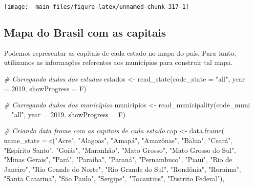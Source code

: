\documentclass[
  brazilian,
]{book}
\newenvironment{Shaded}{\begin{snugshade}}{\end{snugshade}}
\newcommand{\AttributeTok}[1]{\textcolor[rgb]{0.77,0.63,0.00}{#1}}
\newcommand{\CommentTok}[1]{\textcolor[rgb]{0.56,0.35,0.01}{\textit{#1}}}
\newcommand{\DecValTok}[1]{\textcolor[rgb]{0.00,0.00,0.81}{#1}}
\newcommand{\FunctionTok}[1]{\textcolor[rgb]{0.00,0.00,0.00}{#1}}
\newcommand{\NormalTok}[1]{#1}
\newcommand{\OtherTok}[1]{\textcolor[rgb]{0.56,0.35,0.01}{#1}}
\newcommand{\StringTok}[1]{\textcolor[rgb]{0.31,0.60,0.02}{#1}}
\begin{document}
\begin{center}\texttt{[image: \_main\_files/figure-latex/unnamed-chunk-317-1]} \end{center}

\hypertarget{mapa-do-brasil-com-as-capitais}{%
\subsection{Mapa do Brasil com as capitais}\label{mapa-do-brasil-com-as-capitais}}

Podemos representar as capitais de cada estado no mapa do país. Para tanto, utilizamos as informações referentes aos municípios para construir tal mapa.

\begin{Shaded}
\begin{Highlighting}[]
\CommentTok{\# Carregando dados dos estados}
\NormalTok{estados }\OtherTok{\textless{}{-}} \FunctionTok{read\_state}\NormalTok{(}\AttributeTok{code\_state =} \StringTok{"all"}\NormalTok{,}
                      \AttributeTok{year =} \DecValTok{2019}\NormalTok{,}
                      \AttributeTok{showProgress =}\NormalTok{ F)}

\CommentTok{\# Carregando dados dos municípios}
\NormalTok{municipios }\OtherTok{\textless{}{-}} \FunctionTok{read\_municipality}\NormalTok{(}\AttributeTok{code\_muni =} \StringTok{"all"}\NormalTok{,}
                                \AttributeTok{year =} \DecValTok{2019}\NormalTok{,}
                                \AttributeTok{showProgress =}\NormalTok{ F)}

\CommentTok{\# Criando data frame com as capitais de cada estado}
\NormalTok{cap }\OtherTok{\textless{}{-}} \FunctionTok{data.frame}\NormalTok{(}
  \AttributeTok{name\_state =} \FunctionTok{c}\NormalTok{(}\StringTok{"Acre"}\NormalTok{, }\StringTok{"Alagoas"}\NormalTok{, }\StringTok{"Amapá"}\NormalTok{, }\StringTok{"Amazônas"}\NormalTok{, }\StringTok{"Bahia"}\NormalTok{, }\StringTok{"Ceará"}\NormalTok{, }\StringTok{"Espírito Santo"}\NormalTok{, }\StringTok{"Goiás"}\NormalTok{, }\StringTok{"Maranhão"}\NormalTok{, }\StringTok{"Mato Grosso"}\NormalTok{, }\StringTok{"Mato Grosso do Sul"}\NormalTok{, }\StringTok{"Minas Gerais"}\NormalTok{, }\StringTok{"Pará"}\NormalTok{, }\StringTok{"Paraíba"}\NormalTok{, }\StringTok{"Paraná"}\NormalTok{, }\StringTok{"Pernambuco"}\NormalTok{, }\StringTok{"Piauí"}\NormalTok{, }\StringTok{"Rio de Janeiro"}\NormalTok{, }\StringTok{"Rio Grande do Norte"}\NormalTok{, }\StringTok{"Rio Grande do Sul"}\NormalTok{, }\StringTok{"Rondônia"}\NormalTok{, }\StringTok{"Roraima"}\NormalTok{, }\StringTok{"Santa Catarina"}\NormalTok{, }\StringTok{"São Paulo"}\NormalTok{, }\StringTok{"Sergipe"}\NormalTok{, }\StringTok{"Tocantins"}\NormalTok{, }\StringTok{"Distrito Federal"}\NormalTok{),}
  

\end{Highlighting}
\end{Shaded}
\end{document}
